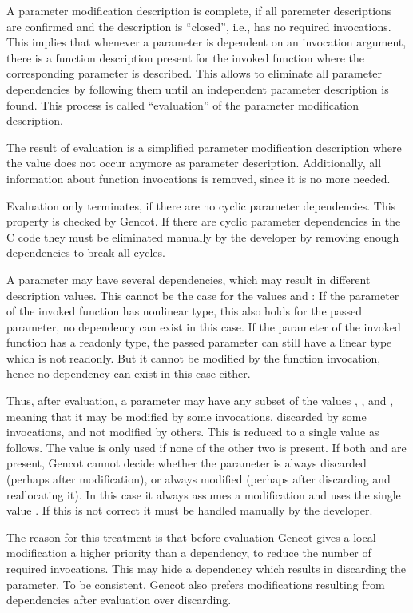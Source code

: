 A parameter modification description is complete, if all paremeter descriptions are confirmed and the description 
is ``closed'', i.e., has no required invocations. This implies that whenever a parameter is dependent on an invocation argument,
there is a function description present for the invoked function where the corresponding parameter is described.
This allows to eliminate all parameter dependencies by following them until an independent parameter description is found.
This process is called ``evaluation'' of the parameter modification description.

The result of evaluation is a simplified parameter modification description where the value  does not 
occur anymore as parameter description. Additionally, all information about function invocations is removed, since it is
no more needed.

Evaluation only terminates, if there are no cyclic parameter dependencies. This property is checked by Gencot. If there
are cyclic parameter dependencies in the C code they must be eliminated manually by the developer by removing enough dependencies 
to break all cycles.

A parameter may have several dependencies, which may result in different description values. This cannot be the case for
the values  and : If the parameter of the invoked function has nonlinear type, this
also holds for the passed parameter, no dependency can exist in this case. If the parameter of the invoked function has
a readonly type, the passed parameter can still have a linear type which is not readonly. But it cannot be modified by the
function invocation, hence no dependency can exist in this case either.

Thus, after evaluation, a parameter may have any subset of the values , , and , meaning 
that it may be modified by some invocations, discarded by some invocations, and not modified by others. This is reduced to
a single value as follows. The value  is only used if none of the other two is present. If both 
and  are present, Gencot cannot decide whether the parameter is always discarded (perhaps after modification),
or always modified (perhaps after discarding and reallocating it). In this case it always assumes a modification and
uses the single value . If this is not correct it must be handled manually by the developer.

The reason for this treatment is that before evaluation Gencot gives a local modification a higher priority than a dependency,
to reduce the number of required invocations. This may hide a dependency which results in discarding the parameter. To
be consistent, Gencot also prefers modifications resulting from dependencies after evaluation over discarding. 

